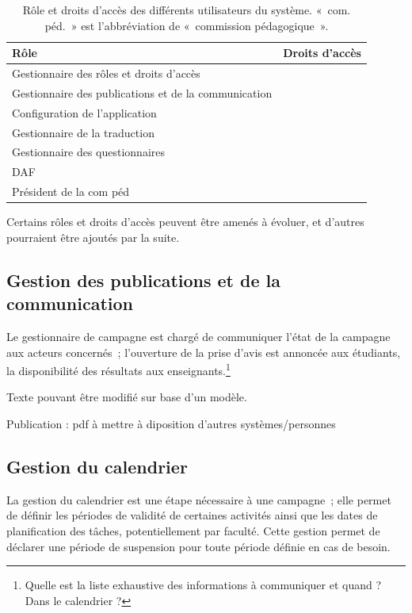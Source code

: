 \documentclass[a4paper,11pt]{report}
\begin{document}
\begin{table}[ht]
\begin{tabularx}{\textwidth}{|X|l|} \hline
Rôle & Droits d'accès \\ \hline
Gestionnaire des rôles et droits d'accès & \\ \hline
Gestionnaire des publications et de la communication & \\ \hline
Configuration de l'application & \\ \hline
Gestionnaire de la traduction & \\ \hline
Gestionnaire des questionnaires & \\ \hline
DAF & \\ \hline
Président de la com péd & \\ \hline

\end{tabularx}
\caption{Rôle et droits d'accès des différents utilisateurs du système. «~com. péd.~» est l'abbréviation de «~commission pédagogique~».}
\label{tab:role-droit}
\end{table}

Certains rôles et droits d'accès peuvent être amenés à évoluer, et d'autres pourraient être ajoutés par la suite.

\subsection{Gestion des publications et de la communication}
Le gestionnaire de campagne est chargé de communiquer l'état de la campagne aux acteurs concernés~; l'ouverture de la prise d'avis est annoncée aux étudiants, la disponibilité des résultats aux enseignants.\footnote{Quelle est la liste exhaustive des informations à communiquer et quand ? Dans le calendrier ?}

Texte pouvant être modifié sur base d'un modèle.

Publication : pdf à mettre à diposition d'autres systèmes/personnes

\subsection{Gestion du calendrier}
La gestion du calendrier est une étape nécessaire à une campagne~; elle permet de définir les périodes de validité de certaines activités ainsi que les dates de planification des tâches, potentiellement par faculté.
Cette gestion permet de déclarer une période de suspension pour toute période définie en cas de besoin.
\end{document}
